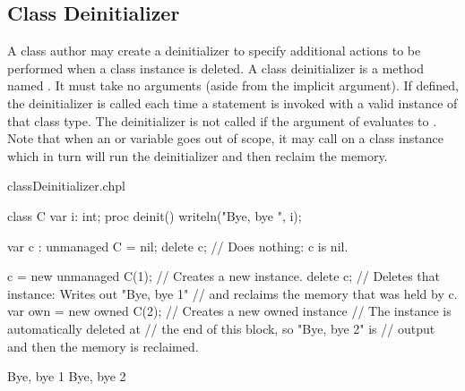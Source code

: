 \subsection{Class Deinitializer}
\label{Class_Deinitializer}

A class author may create a deinitializer to specify additional actions
to be performed when a class instance is deleted.
A class deinitializer is a method named .  It must take no
arguments (aside from the implicit  argument).  If defined,
the deinitializer is called each time a  statement is
invoked with a valid instance of that class type. The deinitializer is
not called if the argument of  evaluates to .
Note that when an  or  variable goes out of
scope, it may call  on a class instance which in turn will
run the deinitializer and then reclaim the memory.

\begin{chapelexample}{classDeinitializer.chpl}
\begin{chapel}
class C {
  var i: int;
  proc deinit() { writeln("Bye, bye ", i); }
}

var c : unmanaged C = nil;
delete c;              // Does nothing: c is nil.

c = new unmanaged C(1); // Creates a new instance.
delete c;               // Deletes that instance: Writes out "Bye, bye 1"
                        // and reclaims the memory that was held by c.
{
  var own = new owned C(2); // Creates a new owned instance
                            // The instance is automatically deleted at
                            // the end of this block, so "Bye, bye 2" is
                            // output and then the memory is reclaimed.
}
\end{chapel}
\begin{chapeloutput}
Bye, bye 1
Bye, bye 2
\end{chapeloutput}
\end{chapelexample}
